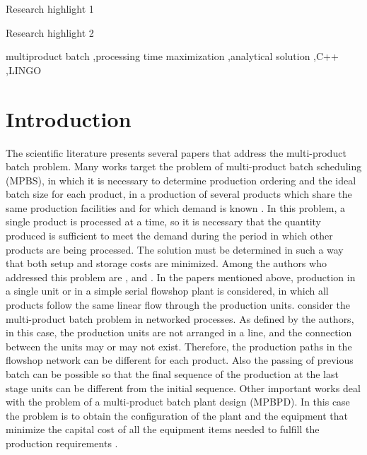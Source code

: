 \documentclass[preprint,12pt,authoryear]{elsarticle}
\begin{document}
\begin{frontmatter}
\begin{highlights}
\item Research highlight 1
\item Research highlight 2
\end{highlights}

\begin{keyword}
multiproduct batch \sep processing time maximization \sep analytical solution \sep C++ \sep LINGO



\end{keyword}

\end{frontmatter}


\section{Introduction}
\label{sec:intro}

The scientific literature presents several papers that address the multi-product batch problem. Many works target the problem of multi-product batch scheduling (MPBS), in which it is necessary to determine production ordering and the ideal batch size for each product, in a production of several products which share the same production facilities and for which demand is known \citep{Eilon1985}. In this problem, a single product is processed at a time, so it is necessary that the quantity produced is sufficient to meet the demand during the period in which other products are being processed. The solution must be determined in such a way that both setup and storage costs are minimized. Among the authors who addressed this problem are \cite{Eilon1985}, \cite{Omega1993} and \cite{LiuEtAl2020}. In the papers mentioned above, production in a single unit or in a  simple serial flowshop plant is considered, in which all products follow the same linear flow through the production units. \cite{KimEtAl1996} consider the multi-product batch problem in networked processes. As defined by the authors, in this case, the production units are not arranged in a line, and the connection between the units may or may not exist. Therefore, the production paths in the flowshop network can be different for each product. Also the passing of previous batch can be possible so that the final sequence of the production at the last stage units can be different from the initial sequence. Other important works deal with the problem of a multi-product batch plant design (MPBPD). In this case the problem is to obtain the configuration of the plant and the equipment that minimize the capital cost of all the equipment items needed to fulfill the production requirements \citep{RavemarkAndRippin1998}. 
\end{document}
